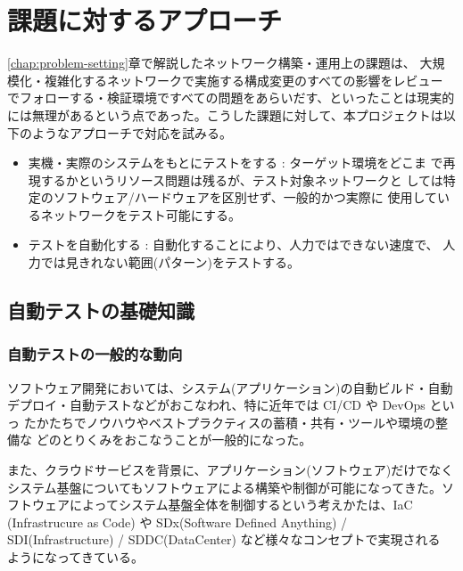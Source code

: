 
\chapter{課題に対するアプローチ}
\label{chap:approach}


\ref{chap:problem-setting}章で解説したネットワーク構築・運用上の課題は、
大規模化・複雑化するネットワークで実施する構成変更のすべての影響をレビュー
でフォローする・検証環境ですべての問題をあらいだす、といったことは現実的
には無理があるという点であった。こうした課題に対して、本プロジェクトは以
下のようなアプローチで対応を試みる。
\begin{itemize}
 \item 実機・実際のシステムをもとにテストをする : ターゲット環境をどこま
       で再現するかというリソース問題は残るが、テスト対象ネットワークと
       しては特定のソフトウェア/ハードウェアを区別せず、一般的かつ実際に
       使用しているネットワークをテスト可能にする。
 \item テストを自動化する : 自動化することにより、人力ではできない速度で、
       人力では見きれない範囲(パターン)をテストする。
\end{itemize}


\section{自動テストの基礎知識}
\label{sec:latedge-test-automation}


  \subsection{自動テストの一般的な動向}
  \label{sec:popular-test-automation}

ソフトウェア開発においては、システム(アプリケーション)の自動ビルド・自動
デプロイ・自動テストなどがおこなわれ、特に近年では CI/CD や DevOps といっ
たかたちでノウハウやベストプラクティスの蓄積・共有・ツールや環境の整備な
どのとりくみをおこなうことが一般的になった。

また、クラウドサービスを背景に、アプリケーション(ソフトウェア)だけでなく
システム基盤についてもソフトウェアによる構築や制御が可能になってきた。ソ
フトウェアによってシステム基盤全体を制御するという考えかたは、IaC
(Infrastrucure as Code) や SDx(Software Defined Anything) /
SDI(Infrastructure) / SDDC(DataCenter) など様々なコンセプトで実現される
ようになってきている。

